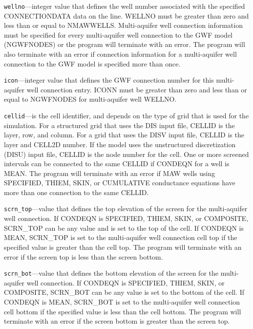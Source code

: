\begin{description}
\item \texttt{wellno}---integer value that defines the well number associated with the specified CONNECTIONDATA data on the line. WELLNO must be greater than zero and less than or equal to NMAWWELLS. Multi-aquifer well connection information must be specified for every multi-aquifer well connection to the GWF model (NGWFNODES) or the program will terminate with an error.  The program will also terminate with an error if connection information for a multi-aquifer well connection to the GWF model is specified more than once.

\item \texttt{icon}---integer value that defines the GWF connection number for this multi-aquifer well connection entry. ICONN must be greater than zero and less than or equal to NGWFNODES for multi-aquifer well WELLNO.

\item \texttt{cellid}---is the cell identifier, and depends on the type of grid that is used for the simulation.  For a structured grid that uses the DIS input file, CELLID is the layer, row, and column.   For a grid that uses the DISV input file, CELLID is the layer and CELL2D number.  If the model uses the unstructured discretization (DISU) input file, CELLID is the node number for the cell. One or more screened intervals can be connected to the same CELLID if CONDEQN for a well is MEAN. The program will terminate with an error if MAW wells using SPECIFIED, THIEM, SKIN, or CUMULATIVE conductance equations have more than one connection to the same CELLID.

\item \texttt{scrn\_top}---value that defines the top elevation of the screen for the multi-aquifer well connection. If CONDEQN is SPECIFIED, THIEM, SKIN, or COMPOSITE, SCRN\_TOP can be any value and is set to the top of the cell. If CONDEQN is MEAN, SCRN\_TOP is set to the multi-aquifer well connection cell top if the specified value is greater than the cell top. The program will terminate with an error if the screen top is less than the screen bottom.

\item \texttt{scrn\_bot}---value that defines the bottom elevation of the screen for the multi-aquifer well connection. If CONDEQN is SPECIFIED, THIEM, SKIN, or COMPOSITE, SCRN\_BOT can be any value is set to the bottom of the cell. If CONDEQN is MEAN, SCRN\_BOT is set to the multi-aquifer well connection cell bottom if the specified value is less than the cell bottom. The program will terminate with an error if the screen bottom is greater than the screen top.


\end{description}
